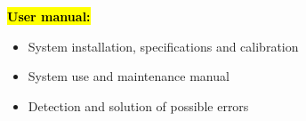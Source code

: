 \documentclass{article}
\begin{document}
\textcolor{red}{\textbf{\hl{User manual:}}}
\begin{itemize}
	\item System installation, specifications and calibration
	\item System use and maintenance manual
	\item Detection and solution of possible errors
\end{itemize}

\end{document}

